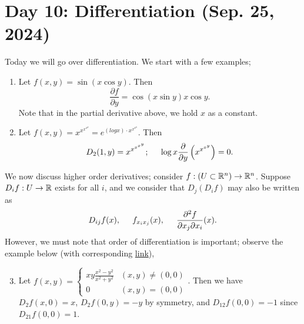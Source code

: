 \section{Day 10: Differentiation (Sep. 25, 2024)}
Today we will go over differentiation. We start with a few examples;
\begin{enumerate}[label=(\alph*)]
    \item Let $f(x, y) = \sin(x \cos y)$. Then
    \[ \frac{\partial f}{\partial y} = \cos(x \sin y) x \cos y. \]
    Note that in the partial derivative above, we hold $x$ as a constant.
    \item Let $f(x, y) = x^{x^{x^{x^y}}} = e^{(log x) \cdot x^{x^{x^y}}}$. Then
    \[ D_2(1, y) = x^{x^{x^{x^y}}}; \hspace{0.2in} \log x \frac{\partial}{\partial y} \left(x^{x^{x^{y}}}\right) = 0. \]
\end{enumerate}

\noindent We now discuss higher order derivatives; consider $f : (U \subset \mathbb R^n) \to \mathbb R^n$. Suppose $D_i f : U \to \mathbb R$ exists for all $i$, and we consider that $D_j(D_i f)$ may also be written as
\[ D_{ij} f(x), \hspace{0.2in} f_{x_i x_j}(x), \hspace{0.2in} \frac{\partial^2 f}{\partial x_j \partial x_i} (x). \]
However, we must note that order of differentiation is important; observe the example below (with corresponding \href{https://en.wikipedia.org/wiki/Symmetry_of_second_derivatives#Requirement_of_continuity}{link}),
\begin{enumerate}[label=(\alph*)]
    \setcounter{enumi}{2}
    \item Let $\displaystyle f(x, y) = \begin{cases} xy \frac{x^2 - y^2}{x^2 + y^2} & (x, y) \neq (0, 0) \\ 0 & (x, y) = (0, 0) \end{cases}$.
    \medskip\newline
    Then we have $D_2 f(x, 0) = x$, $D_2 f(0, y) = -y$ by symmetry, and $D_{12} f(0, 0) = -1$ since $D_{21} f(0, 0) = 1$.
\end{enumerate}

